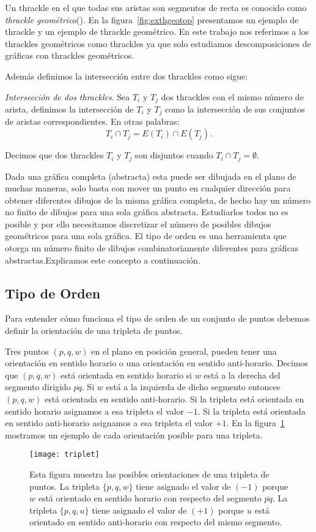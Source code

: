 Un thrackle en el que todas sus aristas son segmentos de recta es conocido como
\emph{thrackle geométrico}(\cite{Schaefer2018}). En la
figura~\ref{fig:exthgeotop} presentamos un ejemplo de thrackle y un ejemplo de
thrackle geométrico. En este trabajo nos referimos a los thrackles geométricos
como thrackles ya que solo estudiamos descomposiciones de gráficas con
thrackles geométricos.

Además definimos la intersección entre dos thrackles como sigue:

\begin{definition}{\emph{Intersección de dos thrackles}.} Sea $T_i$ y $T_j$ dos
  thrackles con el mismo número de arista, definimos la intersección de $T_i$ y
  $T_j$ como la intersección de sus conjuntos de aristas correspondientes. En
  otras palabras:
  \[ T_i \cap T_j = E(T_i) \cap E(T_j).\]
\end{definition}

Decimos que dos thrackles $T_i$ y $T_j$ son disjuntos cuando $T_i\cap T_j = \emptyset$.

Dada una gráfica completa (abstracta) esta puede ser dibujada en el plano
de muchas maneras, solo basta con mover un punto en cualquier dirección
para obtener diferentes dibujos de la misma gráfica completa, de hecho
hay un número no finito de dibujos para una sola gráfica abstracta. Estudiarlos
todos no es posible y por ello necesitamos discretizar el número de
posibles dibujos geométricos para una sola gráfica. El tipo de orden es
una herramienta que otorga un número finito de dibujos combinatoriamente
diferentes para gráficas abstractas.Explicamos este concepto a continuación.

\subsection{Tipo de Orden}

Para entender cómo funciona el tipo de orden de un conjunto de puntos
debemos definir la orientación de una tripleta de puntos.

Tres puntos $(p,q,w)$ en el plano en posición general, pueden tener una
orientación en sentido horario o una orientación en sentido anti-horario.
Decimos que $(p,q,w)$ está orientada en sentido horario si $w$ está a la
derecha del segmento dirigido $\overline{pq}$. Si $w$ está a la izquierda
de dicho segmento entonces $(p,q,w)$ está orientada en sentido anti-horario.
Si la tripleta está orientada en sentido horario asignamos a esa tripleta el
valor $-1$. Si la tripleta está orientada en sentido anti-horario asignamos a
esa tripleta el valor $+1$. En la figura~\ref{fig:triplet} mostramos un ejemplo
de cada orientación posible para una tripleta.
\begin{figure}[htpb]
  \centering
  \texttt{[image: triplet]}
  \caption{Esta figura muestra las posibles orientaciones de una tripleta de
  puntos. La tripleta $\{p,q,w\}$ tiene asignado el valor de $(-1)$ porque $w$
  está orientado en sentido horario con respecto del segmento $\overline{pq}$.
  La tripleta $\{p,q,u\}$ tiene asignado el valor de $(+1)$  porque $u$ está
  orientado en sentido anti-horario con respecto del mismo segmento.}
  \label{fig:triplet}
\end{figure}

